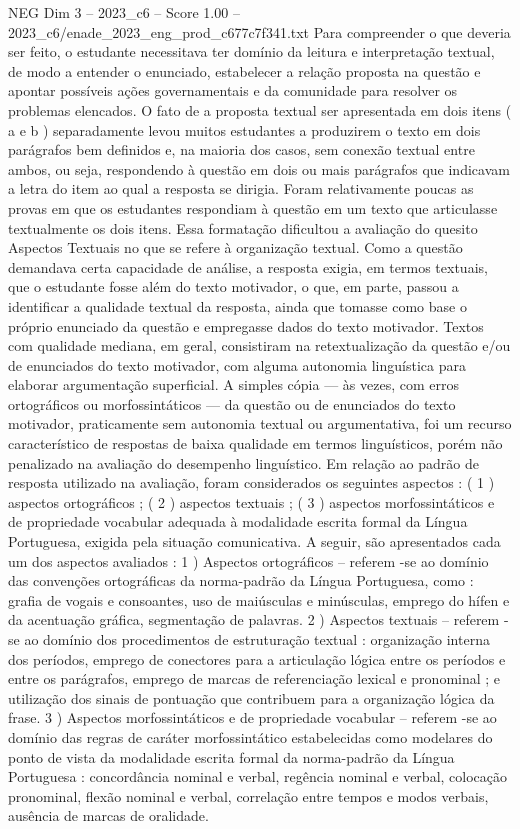 \begin{textsample}{NEG Dim 3 – 2023\_c6 – Score 1.00 – 2023\_c6/enade\_2023\_eng\_prod\_c677c7f341.txt}
Para compreender o que deveria ser feito, o estudante necessitava ter domínio da leitura e interpretação textual, de modo a entender o enunciado, estabelecer a relação proposta na questão e apontar possíveis ações governamentais e da comunidade para resolver os problemas elencados.
O fato de a proposta textual ser apresentada em dois itens ( a e b ) separadamente levou muitos estudantes a produzirem o texto em dois parágrafos bem definidos e, na maioria dos casos, sem conexão textual entre ambos, ou seja, respondendo à questão em dois ou mais parágrafos que indicavam a letra do item ao qual a resposta se dirigia.
Foram relativamente poucas as provas em que os estudantes respondiam à questão em um texto que articulasse textualmente os dois itens.
Essa formatação dificultou a avaliação do quesito Aspectos Textuais no que se refere à organização textual.
Como a questão demandava certa capacidade de análise, a resposta exigia, em termos textuais, que o estudante fosse além do texto motivador, o que, em parte, passou a identificar a qualidade textual da resposta, ainda que tomasse como base o próprio enunciado da questão e empregasse dados do texto motivador.
Textos com qualidade mediana, em geral, consistiram na retextualização da questão e/ou de enunciados do texto motivador, com alguma autonomia linguística para elaborar argumentação superficial.
A simples cópia — às vezes, com erros ortográficos ou morfossintáticos — da questão ou de enunciados do texto motivador, praticamente sem autonomia textual ou argumentativa, foi um recurso característico de respostas de baixa qualidade em termos linguísticos, porém não penalizado na avaliação do desempenho linguístico.
Em relação ao padrão de resposta utilizado na avaliação, foram considerados os seguintes aspectos : ( 1 ) aspectos ortográficos ; ( 2 ) aspectos textuais ; ( 3 ) aspectos morfossintáticos e de propriedade vocabular adequada à modalidade escrita formal da Língua Portuguesa, exigida pela situação comunicativa.
A seguir, são apresentados cada um dos aspectos avaliados : 1 ) Aspectos ortográficos – referem -se ao domínio das convenções ortográficas da norma-padrão da Língua Portuguesa, como : grafia de vogais e consoantes, uso de maiúsculas e minúsculas, emprego do hífen e da acentuação gráfica, segmentação de palavras. 2 ) Aspectos textuais – referem -se ao domínio dos procedimentos de estruturação textual : organização interna dos períodos, emprego de conectores para a articulação lógica entre os períodos e entre os parágrafos, emprego de marcas de referenciação lexical e pronominal ; e utilização dos sinais de pontuação que contribuem para a organização lógica da frase. 3 ) Aspectos morfossintáticos e de propriedade vocabular – referem -se ao domínio das regras de caráter morfossintático estabelecidas como modelares do ponto de vista da modalidade escrita formal da norma-padrão da Língua Portuguesa : concordância nominal e verbal, regência nominal e verbal, colocação pronominal, flexão nominal e verbal, correlação entre tempos e modos verbais, ausência de marcas de oralidade.

\end{textsample}
